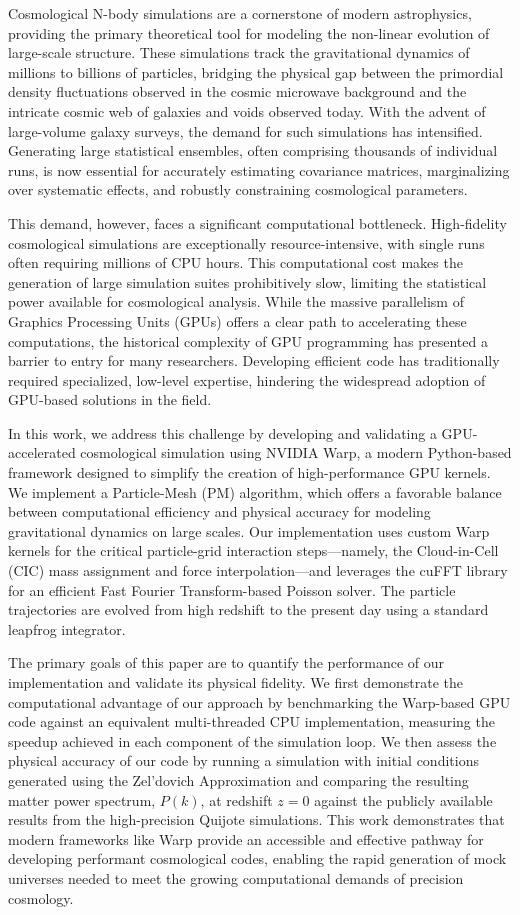 \documentclass[]{article}
\begin{document}
Cosmological N-body simulations are a cornerstone of modern astrophysics, providing the primary theoretical tool for modeling the non-linear evolution of large-scale structure. These simulations track the gravitational dynamics of millions to billions of particles, bridging the physical gap between the primordial density fluctuations observed in the cosmic microwave background and the intricate cosmic web of galaxies and voids observed today. With the advent of large-volume galaxy surveys, the demand for such simulations has intensified. Generating large statistical ensembles, often comprising thousands of individual runs, is now essential for accurately estimating covariance matrices, marginalizing over systematic effects, and robustly constraining cosmological parameters.

This demand, however, faces a significant computational bottleneck. High-fidelity cosmological simulations are exceptionally resource-intensive, with single runs often requiring millions of CPU hours. This computational cost makes the generation of large simulation suites prohibitively slow, limiting the statistical power available for cosmological analysis. While the massive parallelism of Graphics Processing Units (GPUs) offers a clear path to accelerating these computations, the historical complexity of GPU programming has presented a barrier to entry for many researchers. Developing efficient code has traditionally required specialized, low-level expertise, hindering the widespread adoption of GPU-based solutions in the field.

In this work, we address this challenge by developing and validating a GPU-accelerated cosmological simulation using NVIDIA Warp, a modern Python-based framework designed to simplify the creation of high-performance GPU kernels. We implement a Particle-Mesh (PM) algorithm, which offers a favorable balance between computational efficiency and physical accuracy for modeling gravitational dynamics on large scales. Our implementation uses custom Warp kernels for the critical particle-grid interaction steps—namely, the Cloud-in-Cell (CIC) mass assignment and force interpolation—and leverages the cuFFT library for an efficient Fast Fourier Transform-based Poisson solver. The particle trajectories are evolved from high redshift to the present day using a standard leapfrog integrator.

The primary goals of this paper are to quantify the performance of our implementation and validate its physical fidelity. We first demonstrate the computational advantage of our approach by benchmarking the Warp-based GPU code against an equivalent multi-threaded CPU implementation, measuring the speedup achieved in each component of the simulation loop. We then assess the physical accuracy of our code by running a simulation with initial conditions generated using the Zel'dovich Approximation and comparing the resulting matter power spectrum, $P(k)$, at redshift $z=0$ against the publicly available results from the high-precision Quijote simulations. This work demonstrates that modern frameworks like Warp provide an accessible and effective pathway for developing performant cosmological codes, enabling the rapid generation of mock universes needed to meet the growing computational demands of precision cosmology.
\end{document}

